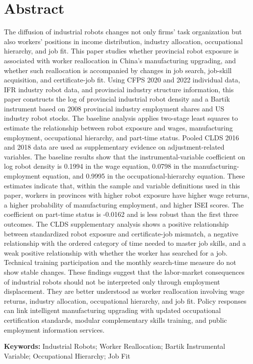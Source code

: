 \documentclass[UTF8, zihao=-4, a4paper, openany, fontset=none]{ctexrep}
\numberwithin{equation}{chapter}
\newenvironment{abstracten}{%
  \clearpage
  \markboth{Abstract}{Abstract}
  \chapter*{Abstract}
  \addcontentsline{toc}{chapter}{Abstract}
}{\par}
\newcommand{\keywordsen}[1]{%
  \par\noindent\textbf{Keywords:} #1\par
}
\begin{document}
\begin{abstracten}
The diffusion of industrial robots changes not only firms' task organization but also workers' positions in income distribution, industry allocation, occupational hierarchy, and job fit. This paper studies whether provincial robot exposure is associated with worker reallocation in China's manufacturing upgrading, and whether such reallocation is accompanied by changes in job search, job-skill acquisition, and certificate-job fit.
Using CFPS 2020 and 2022 individual data, IFR industry robot data, and provincial industry structure information, this paper constructs the log of provincial industrial robot density and a Bartik instrument based on 2008 provincial industry employment shares and US industry robot stocks. The baseline analysis applies two-stage least squares to estimate the relationship between robot exposure and wages, manufacturing employment, occupational hierarchy, and part-time status. Pooled CLDS 2016 and 2018 data are used as supplementary evidence on adjustment-related variables.
The baseline results show that the instrumental-variable coefficient on log robot density is 0.1994 in the wage equation, 0.0798 in the manufacturing-employment equation, and 0.9995 in the occupational-hierarchy equation. These estimates indicate that, within the sample and variable definitions used in this paper, workers in provinces with higher robot exposure have higher wage returns, a higher probability of manufacturing employment, and higher ISEI scores. The coefficient on part-time status is -0.0162 and is less robust than the first three outcomes.
The CLDS supplementary analysis shows a positive relationship between standardized robot exposure and certificate-job mismatch, a negative relationship with the ordered category of time needed to master job skills, and a weak positive relationship with whether the worker has searched for a job. Technical training participation and the monthly search-time measure do not show stable changes.
These findings suggest that the labor-market consequences of industrial robots should not be interpreted only through employment displacement. They are better understood as worker reallocation involving wage returns, industry allocation, occupational hierarchy, and job fit. Policy responses can link intelligent manufacturing upgrading with updated occupational certification standards, modular complementary skills training, and public employment information services.

\keywordsen{Industrial Robots; Worker Reallocation; Bartik Instrumental Variable; Occupational Hierarchy; Job Fit}
\end{abstracten}
\end{document}
